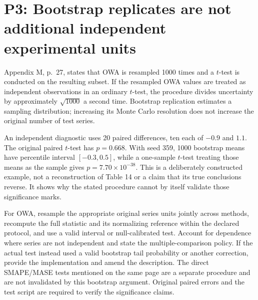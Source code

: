 \documentclass[10pt]{article}
\begin{document}
\section*{P3: Bootstrap replicates are not additional independent experimental units}
Appendix M, p. 27, states that OWA is resampled 1000 times and a \(t\)-test is conducted on the resulting subset. If the resampled OWA values are treated as independent observations in an ordinary \(t\)-test, the procedure divides uncertainty by approximately \(\sqrt{1000}\) a second time. Bootstrap replication estimates a sampling distribution; increasing its Monte Carlo resolution does not increase the original number of test series.\par
An independent diagnostic uses 20 paired differences, ten each of \(-0.9\) and \(1.1\). The original paired \(t\)-test has \(p=0.668\). With seed 359, 1000 bootstrap means have percentile interval \([-0.3,0.5]\), while a one-sample \(t\)-test treating those means as the sample gives \(p=7.70\times10^{-38}\). This is a deliberately constructed example, not a reconstruction of Table 14 or a claim that its true conclusions reverse. It shows why the stated procedure cannot by itself validate those significance marks.\par
For OWA, resample the appropriate original series units jointly across methods, recompute the full statistic and its normalizing reference within the declared protocol, and use a valid interval or null-calibrated test. Account for dependence where series are not independent and state the multiple-comparison policy. If the actual test instead used a valid bootstrap tail probability or another correction, provide the implementation and amend the description. The direct SMAPE/MASE tests mentioned on the same page are a separate procedure and are not invalidated by this bootstrap argument. Original paired errors and the test script are required to verify the significance claims.\par
\end{document}

